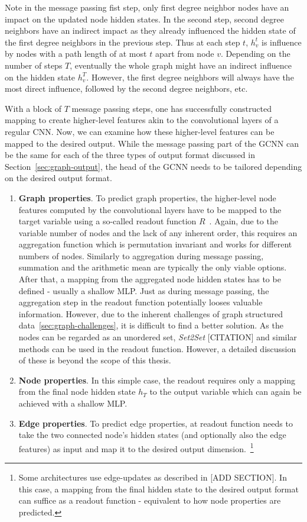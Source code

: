 Note in the message passing fist step, only first degree neighbor nodes have an impact on the updated node hidden states. In the second step, second degree neighbors have an indirect impact as they already influenced the hidden state of the first degree neighbors in the previous step. Thus at each step $t$, $h_v^t$ is influence by nodes with a path length of at most $t$ apart from node $v$. Depending on the number of steps $T$, eventually the whole graph might have an indirect influence on the hidden state $h_v^T$. However, the first degree neighbors will always have the most direct influence, followed by the second degree neighbors, etc.

With a block of $T$ message passing steps, one has successfully constructed mapping to create higher-level features akin to the convolutional layers of a regular CNN. Now, we can examine how these higher-level features can be mapped to the desired output. While the message passing part of the GCNN can be the same for each of the three types of output format discussed in Section~\ref{sec:graph-output}, the head of the GCNN needs to be tailored depending on the desired output format.

\begin{enumerate}
	\item \textbf{Graph properties}. To predict graph properties, the higher-level node features computed by the convolutional layers have to be mapped to the target variable using a so-called readout function $R$~\cite{Gilmer2017}. Again, due to the variable number of nodes and the lack of any inherent order, this requires an aggregation function which is permutation invariant and works for different numbers of nodes. Similarly to aggregation during message passing, summation and the arithmetic mean are typically the only viable options. After that, a mapping from the aggregated node hidden states has to be defined - usually a shallow MLP.
	Just as during message passing, the aggregation step in the readout function potentially looses valuable information. However, due to the inherent challenges of graph structured data~\ref{sec:graph-challenges}, it is difficult to find a better solution. As the nodes can be regarded as an unordered set, \textit{Set2Set} [CITATION] and similar methods can be used in the readout function. However, a detailed discussion of these is beyond the scope of this thesis.
	\item \textbf{Node properties}. In this simple case, the readout requires only a mapping from the final node hidden state $h_T$ to the output variable which can again be achieved with a shallow MLP.
	\item \textbf{Edge properties}. To predict edge properties, at readout function needs to take the two connected node's hidden states (and optionally also the edge features) as input and map it to the desired output dimension.~\footnote{Some architectures use edge-updates as described in [ADD SECTION]. In this case, a mapping from the final hidden state to the desired output format can suffice as a readout function - equivalent to how node properties are predicted.}
\end{enumerate}


